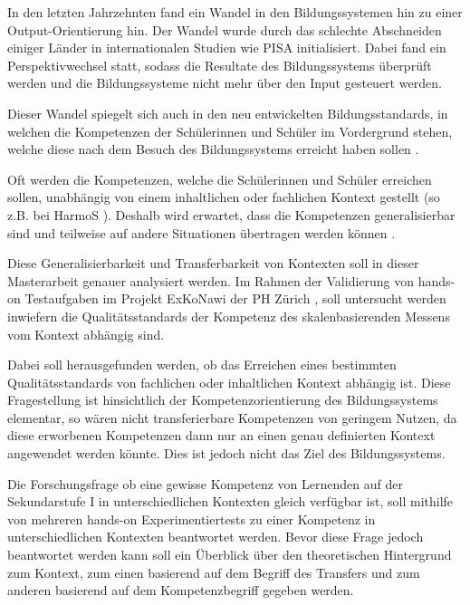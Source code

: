 

In den letzten Jahrzehnten fand ein Wandel in den Bildungssystemen hin zu einer Output-Orientierung hin. Der Wandel wurde durch das schlechte Abschneiden einiger Länder in internationalen Studien wie PISA \citep{PISA-KonsortiumDeuschland2004} initialisiert. Dabei fand ein Perspektivwechsel statt, sodass die Resultate des Bildungssystems überprüft werden und die Bildungssysteme nicht mehr über den Input gesteuert werden.

Dieser Wandel spiegelt sich auch in den neu entwickelten Bildungsstandards, in welchen die Kompetenzen der Schülerinnen und Schüler im Vordergrund stehen, welche diese nach dem Besuch des Bildungssystems erreicht haben sollen \citep{Oelkers2008}.

Oft werden die Kompetenzen, welche die Schülerinnen und Schüler erreichen sollen, unabhängig von einem inhaltlichen oder fachlichen Kontext gestellt (so z.B. bei HarmoS \citet{KonsotriumHarmoSNaturwissenschaften+2010}). Deshalb wird erwartet, dass die Kompetenzen generalisierbar sind und teilweise auf andere Situationen übertragen werden können \citep{Hartig2006}.

Diese Generalisierbarkeit und Transferbarkeit von Kontexten soll in dieser Masterarbeit genauer analysiert werden. Im Rahmen der Validierung von hands-on Testaufgaben im Projekt ExKoNawi der PH Zürich \citep{Metzger2013}, soll untersucht werden inwiefern die Qualitätsstandards der Kompetenz des skalenbasierenden Messens vom Kontext abhängig sind. 

Dabei soll herausgefunden werden, ob das Erreichen eines bestimmten Qualitätsstandards von fachlichen oder inhaltlichen Kontext abhängig ist. Diese Fragestellung ist hinsichtlich der Kompetenzorientierung des Bildungssystems elementar, so wären nicht transferierbare Kompetenzen von geringem Nutzen, da diese erworbenen Kompetenzen dann nur an einen genau definierten Kontext angewendet werden könnte. Dies ist jedoch nicht das Ziel des Bildungssystems.

Die Forschungsfrage ob eine gewisse Kompetenz  von Lernenden auf der Sekundarstufe I in unterschiedlichen Kontexten gleich verfügbar ist, soll mithilfe von mehreren hands-on Experimentiertests zu einer Kompetenz in unterschiedlichen Kontexten beantwortet werden. Bevor diese Frage jedoch beantwortet werden kann soll ein Überblick über den theoretischen Hintergrund zum Kontext, zum einen basierend auf dem Begriff des Transfers und zum anderen basierend auf dem Kompetenzbegriff gegeben werden.









